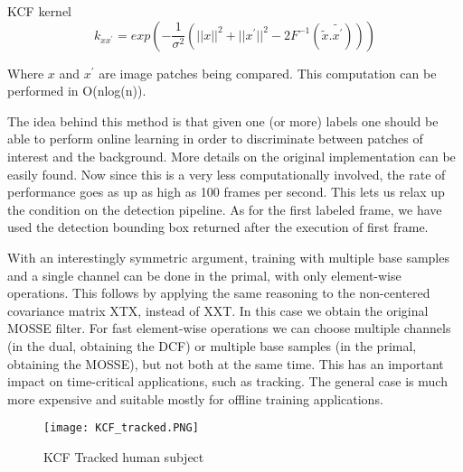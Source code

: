	
	KCF kernel
	\begin{equation}k_{xx^{'}} = exp(-\frac{1}{\sigma^2}(||x||^2+||x^{'}||^2-2F^{-1}(\tilde{x}.\tilde{x^{'}})))\end{equation}
	
	Where $x$ and $x^{'}$ are image patches being compared. This computation can be performed in O(nlog(n)).
	
	The idea behind this method is that given one (or more) labels one should be able to perform online learning in order to discriminate between patches of interest and the background. More details on the original implementation can be easily found. Now since this is a very less computationally involved, the rate of performance goes as up as high as 100 frames per second. This lets us relax up the condition on the detection pipeline. As for the first labeled frame, we have used the detection bounding box returned after the execution of first frame.
	
	With an interestingly symmetric argument, training with multiple base samples and a single channel can be done in the  primal,  with  only  element-wise  operations. This  follows  by  applying  the  same  reasoning  to  the non-centered covariance matrix XTX, instead of XXT. In this case we obtain the original MOSSE filter. For  fast  element-wise  operations  we  can
	choose multiple channels (in the dual, obtaining the DCF) or multiple base samples (in the primal, obtaining the MOSSE), but not both at the same time. This has an important impact on  time-critical  applications,  such  as  tracking. The  general case is  much  more  expensive  and  suitable  mostly  for offline training applications.
	
	\begin{figure}[htb]
		\centering
		\texttt{[image: KCF\_tracked.PNG]}
		\caption{KCF Tracked human subject\label{KCF Tracked human subject}}
	\end{figure}
	
	
	
	